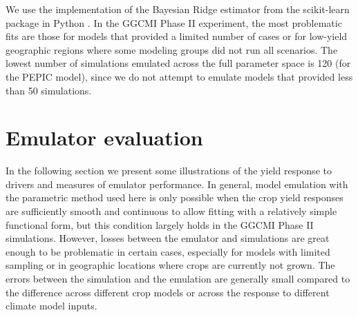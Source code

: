 \documentclass[gmd, manuscript]{copernicus} %
\begin{document}
We use the implementation of the Bayesian Ridge estimator from the scikit-learn package in Python \citep{scikit-learn}. 
In the GGCMI Phase II experiment, the most problematic fits are those for models that provided a limited number of cases or for low-yield geographic regions where some modeling groups did not run all scenarios. 
The lowest number of simulations emulated across the full parameter space is 120 (for the PEPIC model), since we do not attempt to emulate models that provided less than 50 simulations. 

\section{Emulator evaluation}
\label{S:4}
In the following section we present some illustrations of the yield response to drivers and measures of emulator performance. 
In general, model emulation with the parametric method used here is only possible when the crop yield responses are sufficiently smooth and continuous to allow fitting with a relatively simple functional form, but this condition largely holds in the GGCMI Phase II simulations. 
However, losses between the emulator and simulations are great enough to be problematic in certain cases, especially for models with limited sampling or in geographic locations where crops are currently not grown. 
The errors between the simulation and the emulation are generally small compared to the difference across different crop models or across the response to different climate model inputs.
\end{document}
